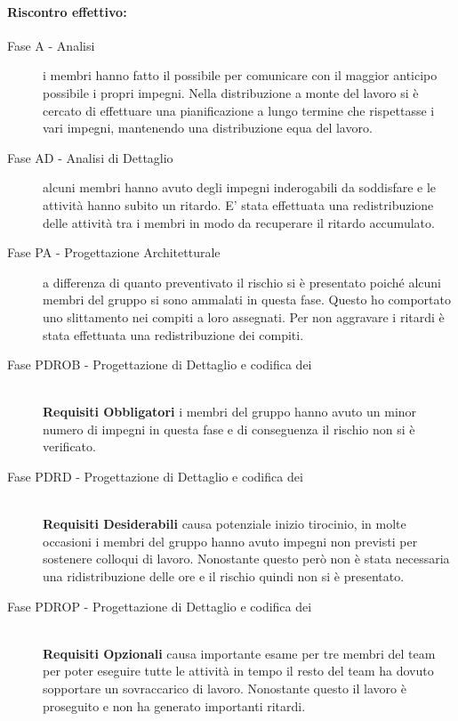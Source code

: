 \documentclass[../PianoProgetto.tex]{subfiles}
\begin{document}
	\paragraph*{Riscontro effettivo:}
		\begin{description}
			\item[Fase A - Analisi] i membri hanno fatto il possibile per comunicare con il maggior anticipo possibile i propri impegni. Nella distribuzione a monte del lavoro si è cercato di effettuare una pianificazione a lungo termine che rispettasse i vari impegni, mantenendo una distribuzione equa del lavoro.
			\item[Fase AD - Analisi di Dettaglio] alcuni membri hanno avuto degli impegni inderogabili da soddisfare e le attività hanno subito un ritardo. E' stata effettuata una redistribuzione delle attività tra i membri in modo da recuperare il ritardo accumulato. 
			\item[Fase PA - Progettazione Architetturale] a differenza  di quanto preventivato il rischio si è presentato poiché alcuni membri del gruppo si sono ammalati in questa fase. Questo ho comportato uno slittamento nei compiti a loro assegnati. Per non aggravare i ritardi è stata effettuata una redistribuzione dei compiti.
			\item[Fase PDROB - Progettazione di Dettaglio e codifica dei]  \ \\
					\textbf{Requisiti Obbligatori} i membri del gruppo hanno avuto un minor numero di impegni in questa fase e di conseguenza il rischio non si è verificato.
			\item[Fase PDRD - Progettazione di Dettaglio e codifica dei] \ \\
					\textbf{Requisiti Desiderabili} causa potenziale inizio tirocinio, in molte occasioni i membri del gruppo hanno avuto impegni non previsti per sostenere colloqui di lavoro. Nonostante questo però non è stata necessaria una ridistribuzione delle ore e il rischio quindi non si è presentato.
			\item[Fase PDROP - Progettazione di Dettaglio e codifica dei]  \ \\
					\textbf{Requisiti Opzionali} causa importante esame per tre membri del team per poter eseguire tutte le attività in tempo il resto del team ha dovuto sopportare un sovraccarico di lavoro. Nonostante questo il lavoro è proseguito e non ha generato importanti ritardi.
		\end{description}
	
\end{document}
